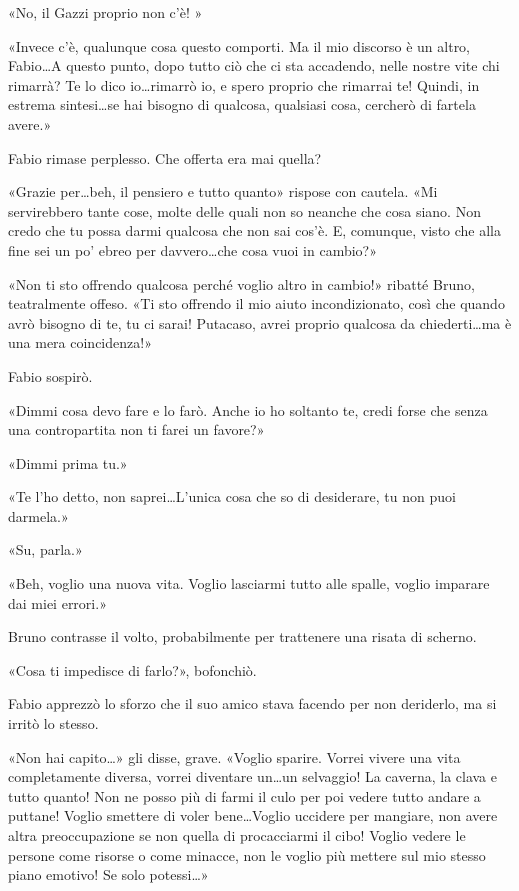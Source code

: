  «No, il Gazzi proprio non c'è! »

«Invece c'è, qualunque cosa questo comporti. Ma il mio discorso è un altro, Fabio\ldots A questo punto, dopo tutto ciò che ci sta accadendo, nelle nostre vite chi rimarrà? Te lo dico io\ldots rimarrò io, e spero proprio che rimarrai te! Quindi, in estrema sintesi\ldots se hai bisogno di qualcosa, qualsiasi cosa, cercherò di fartela avere.»

Fabio rimase perplesso. Che offerta era mai quella?

«Grazie per\ldots beh, il pensiero e tutto quanto» rispose con cautela. «Mi servirebbero tante cose, molte delle quali non so neanche che cosa siano. Non credo che tu possa darmi qualcosa che non sai cos'è. E, comunque, visto che alla fine sei un po' ebreo per davvero\ldots che cosa vuoi in cambio?»

«Non ti sto offrendo qualcosa perché voglio altro in cambio!» ribatté Bruno, teatralmente offeso. «Ti sto offrendo il mio aiuto incondizionato, così che quando avrò bisogno di te, tu ci sarai! Putacaso, avrei proprio qualcosa da chiederti\ldots ma è una mera coincidenza!»

Fabio sospirò.

«Dimmi cosa devo fare e lo farò. Anche io ho soltanto te, credi forse che senza una contropartita non ti farei un favore?»

«Dimmi prima tu.»

«Te l'ho detto, non saprei\ldots L'unica cosa che so di desiderare, tu non puoi darmela.»

«Su, parla.»

«Beh, voglio una nuova vita. Voglio lasciarmi tutto alle spalle, voglio imparare dai miei errori.»

Bruno contrasse il volto, probabilmente per trattenere una risata di scherno.

«Cosa ti impedisce di farlo?», bofonchiò.

Fabio apprezzò lo sforzo che il suo amico stava facendo per non deriderlo, ma si irritò lo stesso.

«Non hai capito\ldots» gli disse, grave. «Voglio sparire. Vorrei vivere una vita completamente diversa, vorrei diventare un\ldots un selvaggio! La caverna, la clava e tutto quanto! Non ne posso più di farmi il culo per poi vedere tutto andare a puttane! Voglio smettere di voler bene\ldots Voglio uccidere per mangiare, non avere altra preoccupazione se non quella di procacciarmi il cibo! Voglio vedere le persone come risorse o come minacce, non le voglio più mettere sul mio stesso piano emotivo! Se solo potessi\ldots»

